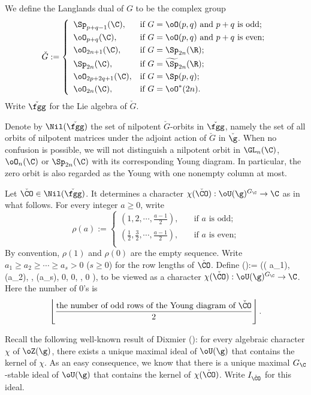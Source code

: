 \documentclass[ssunip.tex]{subfiles}
\begin{document}
   We define the Langlands dual of $G$ to be the complex group
\[
  \check G:=
  \left\{
    \begin{array}{ll}
      \Sp_{p+q-1}(\C) , & \hbox{if $G=\oO(p,q)$ and $p+q$ is odd;} \smallskip\\
    \oO_{p+q}(\C) , & \hbox{if $G=\oO(p,q)$ and $p+q$ is even;} \smallskip \\
    \oO_{2n+1}(\C) , & \hbox{if $G=\Sp_{2n}(\R)$;} \smallskip \\
   \Sp_{2n}(\C) , & \hbox{if $G=\widetilde \Sp_{2n}(\R)$;} \smallskip \\
 \oO_{2p+2q+1}(\C) , & \hbox{if $G=\Sp(p,q)$;} \smallskip \\
 \oO_{2n}(\C) , & \hbox{if $G=\oO^*(2n)$.} \\
    \end{array}
  \right.
\]
 Write $\check \fgg$ for the Lie algebra of $\check G$.

Denote by $\Nil(\check \fgg)$ the set of nilpotent  $\check G$-orbits in $\check \fgg$, namely the set of all  orbits of nilpotent matrices under the adjoint action of $\check G$ in $\check \g$.
When no confusion is possible, we will not distinguish a nilpotent orbit in $\GL_n(\C)$, $\oO_n(\C)$ or $\Sp_{2n}(\C)$ with its corresponding Young diagram. In particular, the zero orbit is also regarded as the Young  with  one nonempty column at most.

Let  $\check \CO \in \Nil(\check \fgg) $.  It determines a character $\chi(\check \CO): \oU(\g)^{G_\C}\rightarrow \C$ as in what follows. For every  integer $a\geq 0$, write
\[
  \rho(a):=\left\{ \begin{array}{ll}
                  (1, 2, \cdots, \frac{a-1}{2}), \quad &\textrm{if $a$ is odd;}\\
                    (\frac{1}{2}, \frac{3}{2}, \cdots, \frac{a-1}{2}), \quad &\textrm{if $a$ is even;}\\
                    \end{array}
                 \right.
\]
By convention, $\rho(1)$ and $\rho(0)$ are  the empty sequence.
Write $a_1\geq  a_2\geq \cdots\geq a_s>0$ ($s\geq 0$)  for the row lengths of  $\check \CO$. Define
\be\label{chico}
 \chi(\check \CO):= (\rho( a_1), \rho(a_2),  \cdots, \rho(a_s), 0, 0, \cdots, 0 ),
\ee
to be viewed as a character $\chi(\check \CO): \oU(\g)^{G_\C}\rightarrow \C$.
Here the number of $0$'s is
\[
 \left\lfloor\frac{\textrm{the number of odd rows of the Young diagram of $\check \CO$}}{2}\right\rfloor.
\]


Recall the following well-known result of Dixmier (\cite[Section 3]{Bor}): for every algebraic character $\chi$ of $\oZ(\g)$, there exists a unique maximal ideal of $\oU(\g)$ that contains the kernel of $\chi$. %
As an easy consequence, we know that there is a unique maximal $G_\C$-stable ideal of $\oU(\g)$ that contains the kernel of $\chi(\check \CO)$. Write $I_{\check \CO}$ for this ideal.
\end{document}
